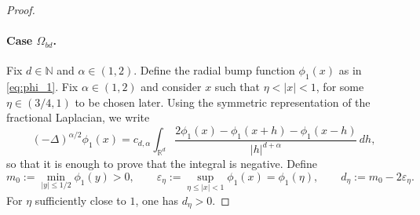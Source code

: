 \documentclass[10pt,a4paper]{amsart}
\begin{document}
\begin{proof}
	\paragraph{Case $\Omega_{bd}$.} 
	Fix $d\in\mathbb{N}$ and $\alpha\in(1,2)$. Define the radial bump function $\phi_1(x)$ as in \eqref{eq:phi_1}. 	 
	Fix $\alpha\in(1,2)$ and consider $x$ such that $\eta<|x|<1$, for some $\eta\in(3/4,1)$ to be chosen later. Using the symmetric representation of the fractional Laplacian, we write
	\begin{equation*}
		(-\Delta)^{\alpha/2}\phi_1(x)
		= c_{d,\alpha}\int_{\mathbb{R}^d}\frac{2\phi_1(x)-\phi_1(x+h)-\phi_1(x-h)}{|h|^{d+\alpha}}\,dh,
	\end{equation*}
	so that it is enough to prove that the integral is negative.
	Define 
	\[
	m_0 := \min_{|y|\le 1/2}\phi_1(y)>0, 
	\qquad 
	\varepsilon_\eta := \sup_{\eta\le |x|<1}\phi_1(x)=\phi_1(\eta),
	\qquad 
	d_\eta := m_0-2\varepsilon_\eta.
	\]
	For $\eta$ sufficiently close to $1$, one has $d_\eta>0$.
	

\end{proof}
\end{document}
